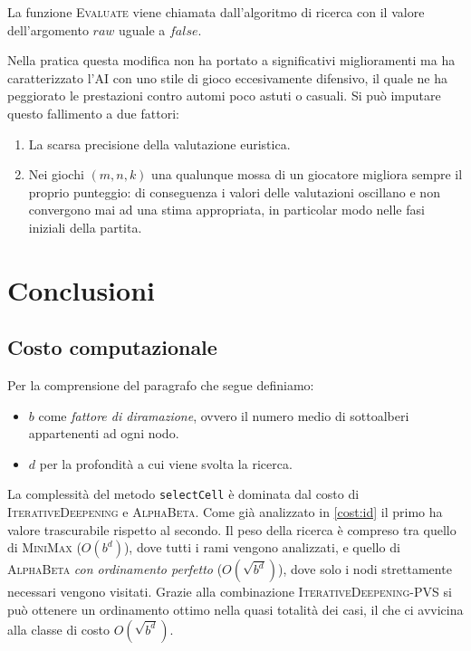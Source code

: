 \documentclass{article}
\begin{document}
La funzione \textsc{Evaluate} viene chiamata dall'algoritmo di ricerca con il valore
dell'argomento $raw$ uguale a $false$.

Nella pratica questa modifica non ha portato a significativi miglioramenti
ma ha caratterizzato l'AI con uno stile di gioco eccesivamente difensivo, il
quale ne ha peggiorato le prestazioni contro automi poco astuti o casuali.
Si pu\`o imputare questo fallimento a due fattori:
\begin{enumerate}
  \item La scarsa precisione della valutazione euristica.
  \item Nei giochi $(m, n, k)$ una qualunque mossa di un giocatore migliora sempre
    il proprio punteggio: di conseguenza i valori delle valutazioni oscillano e
    non convergono mai ad una stima appropriata, in particolar modo nelle fasi
    iniziali della partita.
\end{enumerate}

\section{Conclusioni}

\subsection{Costo computazionale}

Per la comprensione del paragrafo che segue definiamo:
\begin{itemize}
  \item $b$ come \emph{fattore di diramazione}, ovvero il numero medio di
    sottoalberi appartenenti ad ogni nodo.
  \item $d$ per la profondit\`a a cui viene svolta la ricerca.
\end{itemize}

La complessit\`a del metodo \verb!selectCell! \`e dominata dal costo di
\textsc{IterativeDeepening} e \textsc{AlphaBeta}. Come gi\`a analizzato in \ref{cost:id}
il primo ha valore trascurabile rispetto al secondo. Il peso della ricerca \`e
compreso tra quello di \textsc{MiniMax} ($O(b^d)$), dove tutti i rami vengono
analizzati, e quello di \textsc{AlphaBeta} \emph{con ordinamento perfetto}
($O(\sqrt{b^d})$), dove solo i nodi strettamente necessari vengono visitati.
Grazie alla combinazione \textsc{IterativeDeepening}-\textsc{PVS} si pu\`o
ottenere un ordinamento ottimo nella quasi totalit\`a dei casi, il che ci avvicina
alla classe di costo $O(\sqrt{b^d})$.
\end{document}
